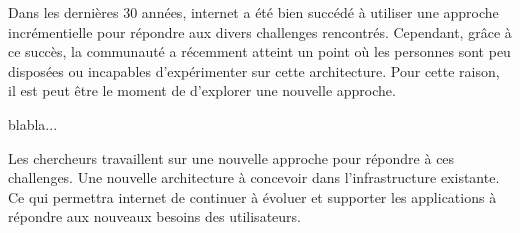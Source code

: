 Dans les dernières 30 années, internet a été bien succédé à utiliser une approche incrémentielle pour répondre aux divers challenges rencontrés. Cependant, grâce à ce succès, la communauté a récemment atteint un point où les personnes sont peu disposées ou incapables d'expérimenter sur cette architecture.  Pour cette raison, il est peut être le moment de d'explorer une nouvelle approche. \cite{InernetCleanSlateDesignApproach}


blabla...

Les chercheurs travaillent sur une nouvelle approche pour répondre à ces challenges. Une nouvelle architecture à concevoir dans l'infrastructure existante. Ce qui permettra internet de continuer à évoluer et supporter les applications à répondre aux nouveaux besoins des utilisateurs.


